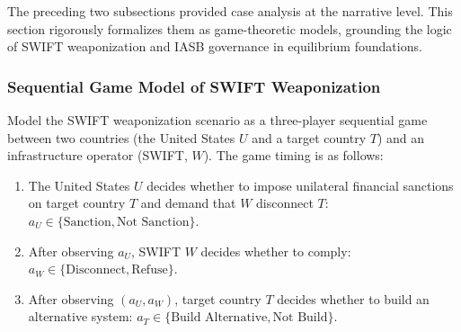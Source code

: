 \documentclass[12pt,a4paper]{article}
\theoremstyle{definition}
\theoremstyle{remark}
\begin{document}
The preceding two subsections provided case analysis at the narrative level. This section rigorously formalizes them as game-theoretic models, grounding the logic of SWIFT weaponization and IASB governance in equilibrium foundations.

\subsubsection{Sequential Game Model of SWIFT Weaponization}

Model the SWIFT weaponization scenario as a three-player sequential game between two countries (the United States $U$ and a target country $T$) and an infrastructure operator (SWIFT, $W$). The game timing is as follows:

\begin{enumerate}[label=Stage \arabic*:, leftmargin=*]
\item The United States $U$ decides whether to impose unilateral financial sanctions on target country $T$ and demand that $W$ disconnect $T$: $a_U \in \{\text{Sanction}, \text{Not Sanction}\}$.
\item After observing $a_U$, SWIFT $W$ decides whether to comply: $a_W \in \{\text{Disconnect}, \text{Refuse}\}$.
\item After observing $(a_U, a_W)$, target country $T$ decides whether to build an alternative system: $a_T \in \{\text{Build Alternative}, \text{Not Build}\}$.
\end{enumerate}
\end{document}
